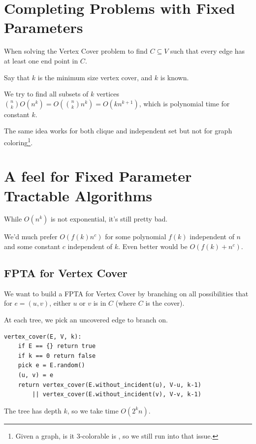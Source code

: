             \section{Completing Problems with Fixed Parameters} %
            \label{sec:completing_problems_with_fixed_parameters}
                When solving the Vertex Cover problem to find $C \subseteq V$ such that every edge has at least one end point in $C$.

                Say that $k$ is the minimum size vertex cover, and $k$ is known.

                We try to find all subsets of $k$ vertices ${n \choose k} O(n^k) = O({n \choose k} n^k) = O(k n^{k+1})$, which is polynomial time for constant $k$.

                The same idea works for both clique and independent set but not for graph coloring\footnote{Given a graph, is it 3-colorable is \npcomplete, so we still run into that issue.}.

            \section{A feel for Fixed Parameter Tractable Algorithms} %
            \label{sec:a_feel_for_fixed_parameter_tractable_algorithms}
                While $O(n^k)$ is not exponential, it's still pretty bad.

                We'd much prefer $O(f(k) n^c)$ for some polynomial $f(k)$ independent of $n$ and some constant $c$ independent of $k$.
                Even better would be $O(f(k) + n^c)$.

                \subsection{FPTA for Vertex Cover} %
                \label{sub:fpta_for_vertex_cover}
                    We want to build a FPTA for Vertex Cover by branching on all possibilities that for $e = (u, v)$, either $u$ or $v$ is in $C$ (where $C$ is the cover).

                    At each tree, we pick an uncovered edge to branch on.

                    \begin{lstlisting}
vertex_cover(E, V, k):
    if E == {} return true
    if k == 0 return false
    pick e = E.random()
    (u, v) = e
    return vertex_cover(E.without_incident(u), V-u, k-1)
        || vertex_cover(E.without_incident(v), V-v, k-1)
                    \end{lstlisting}
                    The tree has depth $k$, so we take time $O(2^k n)$.

